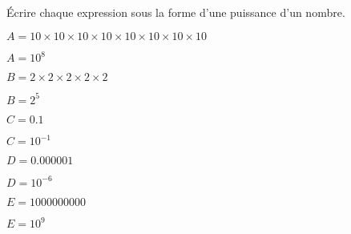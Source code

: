     Écrire chaque expression sous la forme d'une puissance d'un nombre.
    \begin{list}{}{}
        \item[] $A=10\times 10 \times 10\times 10\times 10\times 10\times 10\times 10$

        {\red $A=10^8$}
        \item[] $B=2\times 2\times 2\times 2\times 2$

        {\red $B=2^5$}
        \item[] $C=\num{0.1}$

        {\red $C=10^{-1}$}
        \item[] $D=\num{0.000001}$

        {\red $D=10^{-6}$}
        \item[] $E=\num{1000000000}$

        {\red $E=10^9$}
    \end{list}
    \vspace*{-10mm}
